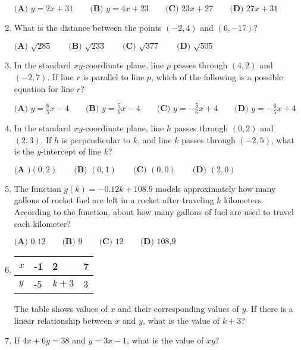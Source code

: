 \documentclass[../satmath.tex]{subfiles}
\begin{document}
\begin{enumerate}[label=\bfseries\arabic*.]
$\textbf{(A) } y=2x+31 \qquad \textbf{(B) } y=4x+23 \qquad \textbf{(C) } 23x+27 \qquad \textbf{(D) }27x+31$

\item What is the distance between the points $(-2,4)$ and $(6,-17)$?

$\textbf{(A) }\sqrt{285} \qquad \textbf{(B) } \sqrt{233} \qquad \textbf{(C) } \sqrt{377} \qquad \textbf{(D) } \sqrt{505}$

\item In the standard $xy$-coordinate plane, line $p$ passes through $(4,2)$ and $(-2,7)$. If line $r$ is parallel to line $p$, which of the following 
is a possible equation for line $r$?

$\textbf{(A) } y=\frac{6}{5}x-4 \qquad \textbf{(B) } y=\frac{5}{6}x-4 \qquad \textbf{(C) } y=-\frac{5}{6}x+4 \qquad \textbf{(D) } y=-\frac{6}{5}x+4$

\item In the standard $xy$-coordinate plane, line $h$ passes through $(0,2)$ and $(2,3)$. If $h$ is perpendicular to $k$, and line $k$ passes 
through $(-2,5)$, what is the $y$-intercept of line $k$?

$\textbf{(A )} (0,2) \qquad \textbf{(B) } (0,1) \qquad \textbf{(C) } (0,0) \qquad \textbf{(D) } (2,0)$

\item The function $g(k)=-0.12k+108.9$ models approximately how many gallons of rocket fuel are left in a rocket after traveling $k$ kilometers. 
According to the function, about how many gallons of fuel are used to travel each kilometer?

$\textbf{(A) } 0.12 \qquad \textbf{(B) } 9 \qquad \textbf{(C) } 12 \qquad \textbf{(D) } 108.9$

\item 

\begin{table}[h]
    \centering
    \begin{tabular}{|l|l|l|l|}
    \hline
    $x$ & -1 & 2 & 7 \\ \hline
    $y$ & -5 & $k+3$ & 3 \\ \hline
    \end{tabular}
\end{table}

The table shows values of $x$ and their corresponding values of $y$. If there is a linear relationship between $x$ and $y$, what is the value of $k+3$?

\item If $4x+6y=38$ and $y=3x-1$, what is the value of $xy$?


\end{enumerate}
\end{document}
